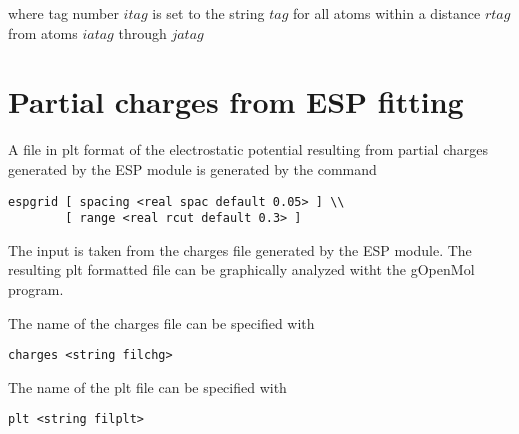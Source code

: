 where tag number $itag$ is set to the string $tag$ for all atoms
within a distance $rtag$ from atoms $iatag$ through $jatag$

\section{Partial charges from ESP fitting}

A file in plt format of the electrostatic potential resulting
from partial charges generated by the ESP module is generated
by the command

\begin{verbatim}
espgrid [ spacing <real spac default 0.05> ] \\
        [ range <real rcut default 0.3> ]
\end{verbatim}

The input is taken from the charges file generated by the ESP module. The
resulting plt formatted file can be graphically analyzed witht the
gOpenMol program.

The name of the charges file can be specified with

\begin{verbatim}
charges <string filchg>
\end{verbatim}

The name of the plt file can be specified with

\begin{verbatim}
plt <string filplt>
\end{verbatim}

